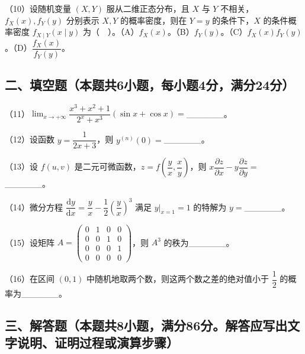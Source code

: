 \documentclass[UTF8,12pt]{ctexart}
\begin{document}
（10）设随机变量 \(\displaystyle (X,\allowbreak Y)\) 服从二维正态分布，且 \(\displaystyle X\) 与 \(\displaystyle Y\) 不相关，\(\displaystyle f_X(x),\allowbreak f_Y(y)\) 分别表示 \(\displaystyle X,\allowbreak Y\) 的概率密度，则在 \(\displaystyle Y=y\) 的条件下，\(\displaystyle X\) 的条件概率密度 \(\displaystyle f_{X\mid Y}(x\mid y)\) 为（　）。（A）\(\displaystyle f_X(x)\)。（B）\(\displaystyle f_Y(y)\)。（C）\(\displaystyle f_X(x)f_Y(y)\)。（D）\(\displaystyle \dfrac{\displaystyle f_X(x)}{\displaystyle f_Y(y)}\)。


\subsection*{二、填空题（本题共6小题，每小题4分，满分24分）}

（11）\(\displaystyle \lim_{x\to+\infty}\dfrac{\displaystyle x^3+x^2+1}{\displaystyle 2^x+x^3}(\sin x+\cos x)=\)\_\_\_\_\_\_。


（12）设函数 \(\displaystyle y=\dfrac{\displaystyle 1}{\displaystyle 2x+3}\)，则 \(\displaystyle y^{(n)}(0)=\)\_\_\_\_\_\_。


（13）设 \(\displaystyle f(u,\allowbreak v)\) 是二元可微函数，\(\displaystyle z=f(\dfrac{\displaystyle y}{\displaystyle x},\allowbreak \dfrac{\displaystyle x}{\displaystyle y})\)，则 \(\displaystyle x\dfrac{\displaystyle \partial z}{\displaystyle \partial x}-y\dfrac{\displaystyle \partial z}{\displaystyle \partial y}=\)\_\_\_\_\_\_。


（14）微分方程 \(\displaystyle \dfrac{\displaystyle \mathrm dy}{\displaystyle \mathrm dx}=\dfrac{\displaystyle y}{\displaystyle x}-\dfrac{\displaystyle 1}{\displaystyle 2}(\dfrac{\displaystyle y}{\displaystyle x})^3\) 满足 \(\displaystyle \left.y\right|_{x=1}=1\) 的特解为 \(\displaystyle y=\)\_\_\_\_\_\_。


（15）设矩阵 \(\displaystyle A=\begin{pmatrix}0&1&0&0\\0&0&1&0\\0&0&0&1\\0&0&0&0\end{pmatrix}\)，则 \(\displaystyle A^3\) 的秩为\_\_\_\_\_\_。


（16）在区间 \(\displaystyle (0,\allowbreak 1)\) 中随机地取两个数，则这两个数之差的绝对值小于 \(\displaystyle \dfrac{\displaystyle 1}{\displaystyle 2}\) 的概率为\_\_\_\_\_\_。


\subsection*{三、解答题（本题共8小题，满分86分。解答应写出文字说明、证明过程或演算步骤）}
\end{document}
